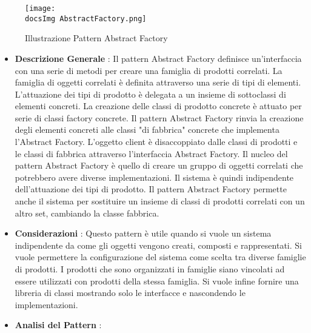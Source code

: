 {{{			\begin{figure}[H]
				\centering
				\texttt{[image: \\docsImg AbstractFactory.png]}
				\caption{Illustrazione Pattern Abstract Factory}
				\label{Illustrazione Pattern Abstract Factory}
			\end{figure}
			
			\begin{itemize}\itemsep1pt
				\item \textbf{Descrizione Generale} : Il pattern Abstract Factory definisce un'interfaccia con una serie di metodi per creare una famiglia di prodotti correlati. La famiglia di oggetti correlati è definita attraverso una serie di tipi di elementi. L'attuazione dei tipi di prodotto è delegata a un insieme di sottoclassi di elementi concreti. La creazione delle classi di prodotto concrete è attuato per serie di classi factory concrete. Il pattern Abstract Factory rinvia la creazione degli elementi concreti alle classi "di fabbrica" concrete che implementa l'Abstract Factory. L'oggetto client è disaccoppiato dalle classi di prodotti e le classi di fabbrica attraverso l'interfaccia Abstract Factory. Il nucleo del pattern Abstract Factory è quello di creare un gruppo di oggetti correlati che potrebbero avere diverse implementazioni. Il sistema è quindi indipendente dell'attuazione dei tipi di prodotto. Il pattern Abstract Factory permette anche il sistema per sostituire un insieme di classi di prodotti correlati con un altro set, cambiando la classe fabbrica.
				\item \textbf{Considerazioni} : Questo pattern è utile quando si vuole un sistema indipendente da come gli oggetti vengono creati, composti e rappresentati. Si vuole permettere la configurazione del sistema come scelta tra diverse famiglie di prodotti. I prodotti che sono organizzati in famiglie siano vincolati ad essere utilizzati con prodotti della stessa famiglia. Si vuole infine fornire una libreria di classi mostrando solo le interfacce e nascondendo le implementazioni.
				\item \textbf{Analisi del Pattern} : \hfill
				

\end{itemize}}}}
